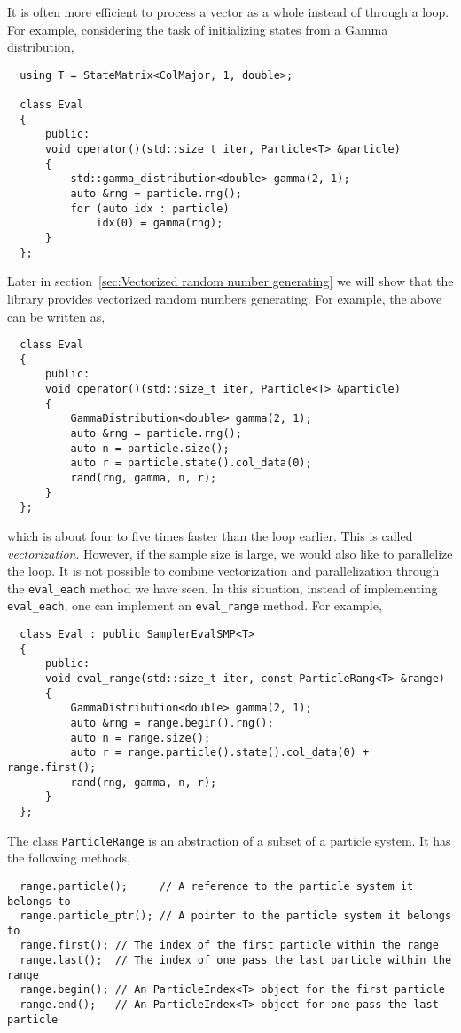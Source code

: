 It is often more efficient to process a vector as a whole instead of through a
loop. For example, considering the task of initializing states from a Gamma
distribution,
\begin{Verbatim}
  using T = StateMatrix<ColMajor, 1, double>;

  class Eval
  {
      public:
      void operator()(std::size_t iter, Particle<T> &particle)
      {
          std::gamma_distribution<double> gamma(2, 1);
          auto &rng = particle.rng();
          for (auto idx : particle)
              idx(0) = gamma(rng);
      }
  };
\end{Verbatim}
Later in section~\ref{sec:Vectorized random number generating} we will show
that the library provides vectorized random numbers generating. For example,
the above can be written as,
\begin{Verbatim}
  class Eval
  {
      public:
      void operator()(std::size_t iter, Particle<T> &particle)
      {
          GammaDistribution<double> gamma(2, 1);
          auto &rng = particle.rng();
          auto n = particle.size();
          auto r = particle.state().col_data(0);
          rand(rng, gamma, n, r);
      }
  };
\end{Verbatim}
which is about four to five times faster than the loop earlier. This is called
\emph{vectorization}. However, if the sample size is large, we would also like
to parallelize the loop. It is not possible to combine vectorization and
parallelization through the \verb|eval_each| method we have seen. In this
situation, instead of implementing \verb|eval_each|, one can implement an
\verb|eval_range| method. For example,
\begin{Verbatim}
  class Eval : public SamplerEvalSMP<T>
  {
      public:
      void eval_range(std::size_t iter, const ParticleRang<T> &range)
      {
          GammaDistribution<double> gamma(2, 1);
          auto &rng = range.begin().rng();
          auto n = range.size();
          auto r = range.particle().state().col_data(0) + range.first();
          rand(rng, gamma, n, r);
      }
  };
\end{Verbatim}
The class \verb|ParticleRange| is an abstraction of a subset of a particle
system. It has the following methods,
\begin{Verbatim}
  range.particle();     // A reference to the particle system it belongs to
  range.particle_ptr(); // A pointer to the particle system it belongs to
  range.first(); // The index of the first particle within the range
  range.last();  // The index of one pass the last particle within the range
  range.begin(); // An ParticleIndex<T> object for the first particle
  range.end();   // An ParticleIndex<T> object for one pass the last particle
\end{Verbatim}
